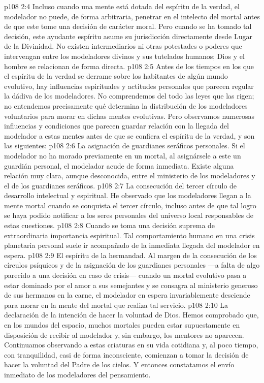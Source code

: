 \vs p108 2:4 Incluso cuando una mente está dotada del espíritu de la verdad, el modelador no puede, de forma arbitraria, penetrar en el intelecto del mortal antes de que este tome una decisión de carácter moral. Pero cuando se ha tomado tal decisión, este ayudante espíritu asume su jurisdicción directamente desde Lugar de la Divinidad. No existen intermediarios ni otras potestades o poderes que intervengan entre los modeladores divinos y sus tutelados humanos; Dios y el hombre se relacionan de forma directa.
\vs p108 2:5 Antes de los tiempos en los que el espíritu de la verdad se derrame sobre los habitantes de algún mundo evolutivo, hay influencias espirituales y actitudes personales que parecen regular la dádiva de los modeladores. No comprendemos del todo las leyes que las rigen; no entendemos precisamente qué determina la distribución de los modeladores voluntarios para morar en dichas mentes evolutivas. Pero observamos numerosas influencias y condiciones que parecen guardar relación con la llegada del modelador a estas mentes antes de que se confiera el espíritu de la verdad, y son las siguientes:
\vs p108 2:6 La asignación de guardianes seráficos personales. Si el modelador no ha morado previamente en un mortal, al asignársele a este un guardián personal, el modelador acude de forma inmediata. Existe alguna relación muy clara, aunque desconocida, entre el ministerio de los modeladores y el de los guardianes seráficos.
\vs p108 2:7 La consecución del tercer círculo de desarrollo intelectual y espiritual. He observado que los modeladores llegan a la mente mortal cuando se conquista el tercer círculo, incluso antes de que tal logro se haya podido notificar a los seres personales del universo local responsables de estas cuestiones.
\vs p108 2:8 Cuando se toma una decisión suprema de extraordinaria importancia espiritual. Tal comportamiento humano en una crisis planetaria personal suele ir acompañado de la inmediata llegada del modelador en espera.
\vs p108 2:9 El espíritu de la hermandad. Al margen de la consecución de los círculos psíquicos y de la asignación de los guardianes personales ---a falta de algo parecido a una decisión en caso de crisis--- cuando un mortal evolutivo pasa a estar dominado por el amor a sus semejantes y se consagra al ministerio generoso de sus hermanos en la carne, el modelador en espera invariablemente desciende para morar en la mente del mortal que realiza tal servicio.
\vs p108 2:10 La declaración de la intención de hacer la voluntad de Dios. Hemos comprobado que, en los mundos del espacio, muchos mortales pueden estar supuestamente en disposición de recibir al modelador y, sin embargo, los mentores no aparecen. Continuamos observando a estas criaturas en su vida cotidiana y, al poco tiempo, con tranquilidad, casi de forma inconsciente, comienzan a tomar la decisión de hacer la voluntad del Padre de los cielos. Y entonces constatamos el envío inmediato de los modeladores del pensamiento.
